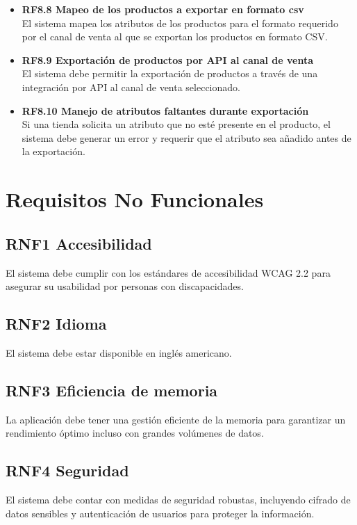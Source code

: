 \documentclass{article}
\begin{document}
\begin{itemize}
    \item \textbf{RF8.8 Mapeo de los productos a exportar en formato csv} \\
    El sistema mapea los atributos de los productos para el formato requerido por el canal de venta al que se exportan los productos en formato CSV.

    \item \textbf{RF8.9 Exportación de productos por API al canal de venta} \\
    El sistema debe permitir la exportación de productos a través de una integración por API al canal de venta seleccionado.

    \item \textbf{RF8.10 Manejo de atributos faltantes durante exportación} \\
    Si una tienda solicita un atributo que no esté presente en el producto, el sistema debe generar un error y requerir que el atributo sea añadido antes de la exportación.
\end{itemize}

\section{Requisitos No Funcionales}
\subsection*{RNF1 Accesibilidad}
El sistema debe cumplir con los estándares de accesibilidad WCAG 2.2 para asegurar su usabilidad por personas con discapacidades.

\subsection*{RNF2 Idioma}
El sistema debe estar disponible en inglés americano.

\subsection*{RNF3 Eficiencia de memoria}
La aplicación debe tener una gestión eficiente de la memoria para garantizar un rendimiento óptimo incluso con grandes volúmenes de datos.

\subsection*{RNF4 Seguridad}
El sistema debe contar con medidas de seguridad robustas, incluyendo cifrado de datos sensibles y autenticación de usuarios para proteger la información.
\end{document}
